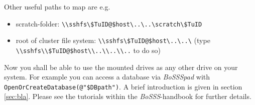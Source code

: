 \documentclass[11pt,twoside,a4paper]{fdyartcl}
\newcommand{\Bosss}{\textit{BoSSS}}
\begin{document}
Other useful paths to map are e.g.
\begin{itemize}
	\item[] scratch-folder: \verb|\\sshfs\$TuID@$host\..\..\scratch\$TuID|
	\item[] root of cluster file system: \verb|\\sshfs\$TuID@$host\..\..\|
	(type \verb|\\sshfs\\$TuID@$host\\..\\..\\..| to do so)
\end{itemize}

Now you shall be able to use the mounted drives as any other drive on your system. For example you can access a database via \emph{BoSSSpad} with \verb|OpenOrCreateDatabase(@"$DBpath")|. A brief introduction is given in section \ref{sec:bla}. Please see the tutorials within the \Bosss-handbook for further details.
\end{document}
